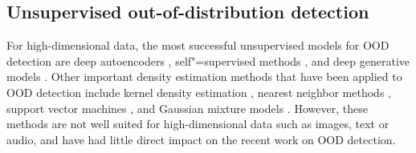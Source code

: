 \subsection{Unsupervised out-of-distribution detection} \label{subsec: unsupervised-out-of-distribution-detection}


For high-dimensional data, the most successful unsupervised models for OOD detection are deep autoencoders \parencite{hinton_reducing_2006}, self"=supervised methods \parencite{mikolov_efficient_2013,devlin_bert_2018,schneider_wav2vec_2019,chen_simple_2020}, and deep generative models \parencite{kingma_autoencoding_2014,rezende_stochastic_2014,dinh_nice_2015,rezende_variational_2015,ho_denoising_2020,hinton_fast_2006,oord_conditional_2016,goodfellow_generative_2014}. 
Other important density estimation methods that have been applied to OOD detection include kernel density estimation \parencite{parzen_estimation_1962}, nearest neighbor methods \parencite{cover_nearest_1967}, support vector machines \parencite{cortes_supportvector_1995,scholkopf_estimating_2001}, and Gaussian mixture models \parencite{dempster_maximum_1977}. 
However, these methods are not well suited for high-dimensional data such as images, text or audio, and have had little direct impact on the recent work on OOD detection. 

